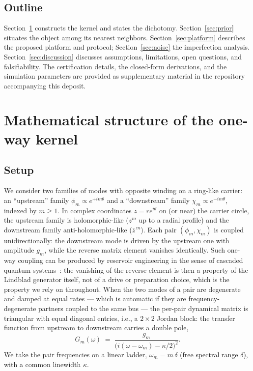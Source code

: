\documentclass[11pt,a4paper]{article}
\newcommand{\zb}{\bar{z}}
\begin{document}
\subsection{Outline}

Section~\ref{sec:structure} constructs the kernel and states the dichotomy.
Section~\ref{sec:prior} situates the object among its nearest neighbors.
Section~\ref{sec:platform} describes the proposed platform and protocol;
Section~\ref{sec:noise} the imperfection analysis. Section~\ref{sec:discussion}
discusses assumptions, limitations, open questions, and falsifiability. The
certification details, the closed-form derivations, and the simulation
parameters are provided as supplementary material in the repository
accompanying this deposit.

\section{Mathematical structure of the one-way kernel}
\label{sec:structure}

\subsection{Setup}

We consider two families of modes with opposite winding on a ring-like carrier:
an ``upstream'' family $\phi_m \propto e^{+i m \theta}$ and a ``downstream''
family $\chi_m \propto e^{-i m \theta}$, indexed by $m \geq 1$. In complex
coordinates $z = r e^{i\theta}$ on (or near) the carrier circle, the upstream
family is holomorphic-like ($z^m$ up to a radial profile) and the downstream
family anti-holomorphic-like ($\zb^{\,m}$). Each pair $(\phi_m, \chi_m)$ is coupled
unidirectionally: the downstream mode is driven by the upstream one with
amplitude $g_m$, while the reverse matrix element vanishes identically. Such
one-way coupling can be produced by reservoir engineering in the sense of
cascaded quantum systems~\cite{Gardiner1993,Carmichael1993,MetelmannClerk2015}:
the vanishing of the reverse element is then a
property of the Lindblad generator itself, not of a drive or preparation
choice, which is the property we rely on throughout. When the two modes of a
pair are degenerate and damped at equal rates --- which is automatic if they are
frequency-degenerate partners coupled to the same bus --- the per-pair dynamical
matrix is triangular with equal diagonal entries, i.e., a $2\times 2$ Jordan block: the
transfer function from upstream to downstream carries a double pole,
\begin{equation}
G_m(\omega) \;=\; \frac{g_m}{\bigl(i(\omega - \omega_m) - \kappa/2\bigr)^{2}}.
\end{equation}
We take the pair frequencies on a linear ladder, $\omega_m = m\,\delta$ (free
spectral range $\delta$), with a common linewidth $\kappa$.
\end{document}
